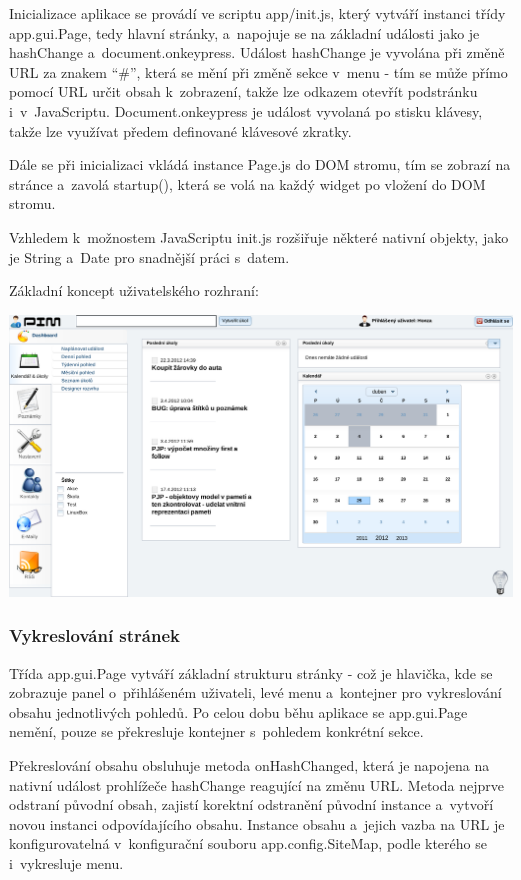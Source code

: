 \documentclass[bc,male,html,dept460]{diploma}				%
\begin{document}
Inicializace aplikace se provádí ve scriptu app/init.js, který vytváří instanci třídy app.gui.Page, tedy hlavní stránky, a~napojuje se na základní události jako je hashChange a~document.onkeypress. Událost hashChange je vyvolána při změně URL za znakem ``\#'', která se mění při změně sekce v~menu - tím se může přímo pomocí URL určit obsah k~zobrazení, takže lze odkazem otevřít podstránku i~v~JavaScriptu. Document.onkeypress je událost vyvolaná po stisku klávesy, takže lze využívat předem definované klávesové zkratky.

Dále se při inicializaci vkládá instance Page.js do DOM stromu, tím se zobrazí na stránce a~zavolá startup(), která se volá na každý widget po vložení do DOM stromu.

Vzhledem k~možnostem JavaScriptu init.js rozšiřuje některé nativní objekty, jako je String a~Date pro snadnější práci s~datem.

\bigskip
Základní koncept uživatelského rozhraní:

\includegraphics[width=\textwidth]{../screens/screen1.png} 

\subsubsection{Vykreslování stránek}
Třída app.gui.Page vytváří základní strukturu stránky - což je hlavička, kde se zobrazuje panel o~přihlášeném uživateli, levé menu a~kontejner pro vykreslování obsahu jednotlivých pohledů. Po celou dobu běhu aplikace se app.gui.Page nemění, pouze se překresluje kontejner s~pohledem konkrétní sekce.

Překreslování obsahu obsluhuje metoda onHashChanged, která je napojena na nativní událost prohlížeče hashChange reagující na změnu URL. Metoda nejprve odstraní původní obsah, zajistí korektní odstranění původní instance a~vytvoří novou instanci odpovídajícího obsahu. Instance obsahu a~jejich vazba na URL je konfigurovatelná v~konfigurační souboru app.config.SiteMap, podle kterého se i~vykresluje menu.
\end{document}
